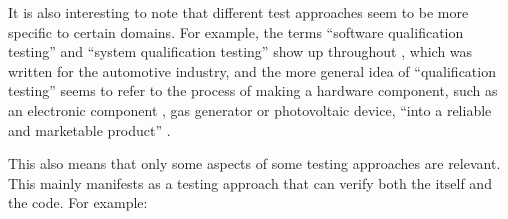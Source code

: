     It is also interesting to note that different test approaches seem to be more
    specific to certain domains. For example, the terms ``software qualification
    testing'' and ``system qualification testing'' show up throughout
    \citep{SPICE2022}, which was written for the automotive industry, and the more
    general idea of ``qualification testing'' seems to refer to the process of
    making a hardware component, such as an electronic component
    \citep{AhsanEtAl2020}, gas generator \citep{ParateEtAl2021} or photovoltaic
    device, ``into a reliable and marketable product'' \citep[p.~1]{SuhirEtAl2013}.
\fi

This also means that only some aspects of some testing approaches are relevant.
This mainly manifests as a testing approach that can verify both the \acsVNV{}
itself and the code. For example:

